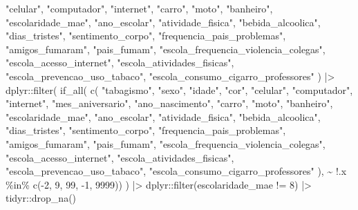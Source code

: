 \documentclass[
]{article}
\newenvironment{Shaded}{\begin{snugshade}}{\end{snugshade}}
\newcommand{\DecValTok}[1]{\textcolor[rgb]{0.68,0.00,0.00}{#1}}
\newcommand{\FunctionTok}[1]{\textcolor[rgb]{0.28,0.35,0.67}{#1}}
\newcommand{\NormalTok}[1]{\textcolor[rgb]{0.00,0.23,0.31}{#1}}
\newcommand{\SpecialCharTok}[1]{\textcolor[rgb]{0.37,0.37,0.37}{#1}}
\newcommand{\StringTok}[1]{\textcolor[rgb]{0.13,0.47,0.30}{#1}}
\begin{document}
\begin{Shaded}
\begin{Highlighting}[]
    \StringTok{"celular"}\NormalTok{,}
    \StringTok{"computador"}\NormalTok{,}
    \StringTok{"internet"}\NormalTok{,}
    \StringTok{"carro"}\NormalTok{,}
    \StringTok{"moto"}\NormalTok{,}
    \StringTok{"banheiro"}\NormalTok{,}
    \StringTok{"escolaridade\_mae"}\NormalTok{,}
    \StringTok{"ano\_escolar"}\NormalTok{,}
    \StringTok{"atividade\_fisica"}\NormalTok{,}
    \StringTok{"bebida\_alcoolica"}\NormalTok{,}
    \StringTok{"dias\_tristes"}\NormalTok{,}
    \StringTok{"sentimento\_corpo"}\NormalTok{,}
    \StringTok{"frequencia\_pais\_problemas"}\NormalTok{,}
    \StringTok{"amigos\_fumaram"}\NormalTok{,}
    \StringTok{"pais\_fumam"}\NormalTok{,}
    \StringTok{"escola\_frequencia\_violencia\_colegas"}\NormalTok{,}
    \StringTok{"escola\_acesso\_internet"}\NormalTok{,}
    \StringTok{"escola\_atividades\_fisicas"}\NormalTok{,}
    \StringTok{"escola\_prevencao\_uso\_tabaco"}\NormalTok{,}
    \StringTok{"escola\_consumo\_cigarro\_professores"}
\NormalTok{  ) }\SpecialCharTok{|\textgreater{}}
\NormalTok{  dplyr}\SpecialCharTok{::}\FunctionTok{filter}\NormalTok{(}
    \FunctionTok{if\_all}\NormalTok{(}
      \FunctionTok{c}\NormalTok{(}
        \StringTok{"tabagismo"}\NormalTok{,}
        \StringTok{"sexo"}\NormalTok{,}
        \StringTok{"idade"}\NormalTok{,}
        \StringTok{"cor"}\NormalTok{,}
        \StringTok{"celular"}\NormalTok{,}
        \StringTok{"computador"}\NormalTok{,}
        \StringTok{"internet"}\NormalTok{,}
        \StringTok{"mes\_aniversario"}\NormalTok{,}
        \StringTok{"ano\_nascimento"}\NormalTok{,}
        \StringTok{"carro"}\NormalTok{,}
        \StringTok{"moto"}\NormalTok{,}
        \StringTok{"banheiro"}\NormalTok{,}
        \StringTok{"escolaridade\_mae"}\NormalTok{,}
        \StringTok{"ano\_escolar"}\NormalTok{,}
        \StringTok{"atividade\_fisica"}\NormalTok{,}
        \StringTok{"bebida\_alcoolica"}\NormalTok{,}
        \StringTok{"dias\_tristes"}\NormalTok{,}
        \StringTok{"sentimento\_corpo"}\NormalTok{,}
        \StringTok{"frequencia\_pais\_problemas"}\NormalTok{,}
        \StringTok{"amigos\_fumaram"}\NormalTok{,}
        \StringTok{"pais\_fumam"}\NormalTok{,}
        \StringTok{"escola\_frequencia\_violencia\_colegas"}\NormalTok{,}
        \StringTok{"escola\_acesso\_internet"}\NormalTok{,}
        \StringTok{"escola\_atividades\_fisicas"}\NormalTok{,}
        \StringTok{"escola\_prevencao\_uso\_tabaco"}\NormalTok{,}
        \StringTok{"escola\_consumo\_cigarro\_professores"}
\NormalTok{      ),}
      \SpecialCharTok{\textasciitilde{}} \SpecialCharTok{!}\NormalTok{.x }\SpecialCharTok{\%in\%} \FunctionTok{c}\NormalTok{(}\SpecialCharTok{{-}}\DecValTok{2}\NormalTok{, }\DecValTok{9}\NormalTok{, }\DecValTok{99}\NormalTok{, }\SpecialCharTok{{-}}\DecValTok{1}\NormalTok{, }\DecValTok{9999}\NormalTok{))}
\NormalTok{  ) }\SpecialCharTok{|\textgreater{}}
\NormalTok{  dplyr}\SpecialCharTok{::}\FunctionTok{filter}\NormalTok{(escolaridade\_mae }\SpecialCharTok{!=} \DecValTok{8}\NormalTok{) }\SpecialCharTok{|\textgreater{}}
\NormalTok{  tidyr}\SpecialCharTok{::}\FunctionTok{drop\_na}\NormalTok{()}
\end{Highlighting}
\end{Shaded}
\end{document}
